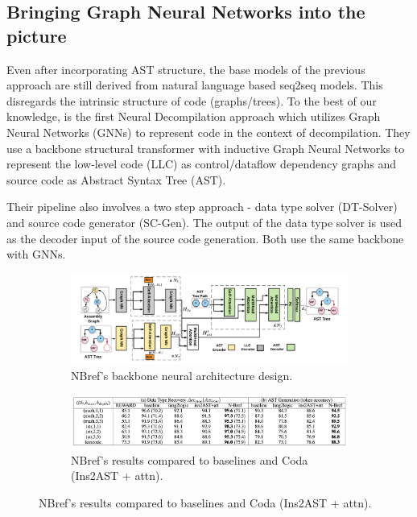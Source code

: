 \documentclass{article}
\begin{document}
\subsection{Bringing Graph Neural Networks into the picture}
Even after incorporating AST structure, the base models of the previous approach are still derived from natural language based seq2seq models. This disregards the intrinsic structure of code (graphs/trees). To the best of our knowledge, \cite{nbref} is the first Neural Decompilation approach which utilizes Graph Neural Networks (GNNs) to represent code in the context of decompilation. They use a backbone structural transformer \cite{vaswani2017attention} with inductive Graph Neural Networks \cite{hamilton2017inductive} to represent the low-level code (LLC) as control/dataflow dependency graphs and source code as Abstract Syntax Tree (AST).

Their pipeline also involves a two step approach - data type solver (DT-Solver) and source code generator (SC-Gen). The output of the data type solver is used as the decoder input of the source
code generation. Both use the same backbone with GNNs.

\begin{figure}[ht]
\centering
\begin{subfigure}{\textwidth}
   \centerline{\includegraphics[width=\textwidth]{Images/decompilation_nbref.png}}
    \caption{NBref's \cite{nbref} backbone neural architecture design.}
    \label{decompilation_nbref} 
\end{subfigure}
\hfill
\begin{subfigure}{\textwidth}
   \centerline{\includegraphics[width=\textwidth]{Images/nbref_results.png}}
    \caption{NBref's \cite{nbref} results compared to baselines and Coda (Ins2AST + attn).}
    \label{nbref_results} 
\end{subfigure}
\end{figure}
\end{document}
